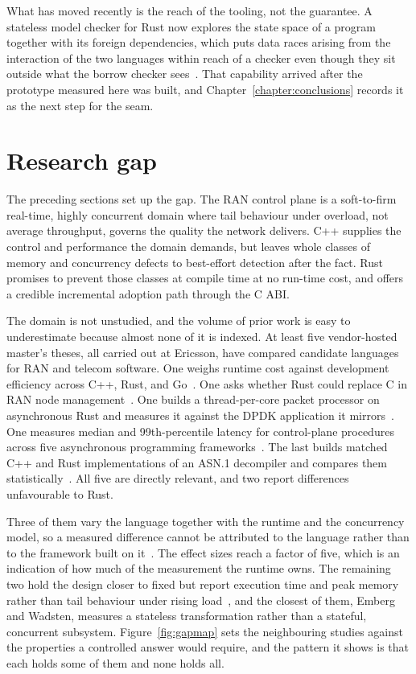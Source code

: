 \documentclass[english,twoside,openright,a4paper,censored,csm,software-track-2020]{HYthesisML}
\begin{document}
What has moved recently is the reach of the tooling, not the guarantee. A stateless model
checker for Rust now explores the state space of a program together with its foreign
dependencies, which puts data races arising from the interaction of the two languages within
reach of a checker even though they sit outside what the borrow checker
sees~\cite{pearce2026rustmc}. That capability arrived after the prototype measured here was
built, and Chapter~\ref{chapter:conclusions} records it as the next step for the seam.

\section{Research gap}\label{sec:gap}
The preceding sections set up the gap. The RAN control plane is a soft-to-firm real-time,
highly concurrent domain where tail behaviour under overload, not average throughput, governs
the quality the network delivers. C++ supplies the control and performance the domain demands,
but leaves whole classes of memory and concurrency defects to best-effort detection after the
fact. Rust promises to prevent those classes at compile time at no run-time cost, and offers a
credible incremental adoption path through the C ABI.

The domain is not unstudied, and the volume of prior work is easy to underestimate because
almost none of it is indexed. At least five vendor-hosted master's theses, all carried out at
Ericsson, have compared candidate languages for RAN and telecom software. One weighs runtime
cost against development efficiency across C++, Rust, and Go~\cite{karlback2021ran}. One asks
whether Rust could replace C in RAN node management~\cite{olsson2023ranmgmt}. One builds a
thread-per-core packet processor on asynchronous Rust and measures it against the DPDK
application it mirrors~\cite{olsson2023asyncpackets}. One measures median and 99th-percentile
latency for control-plane procedures across five asynchronous programming
frameworks~\cite{arvidsson2025async}. The last builds matched C++ and Rust implementations of an
ASN.1 decompiler and compares them statistically~\cite{emberg2023asn1}. All five are directly
relevant, and two report differences unfavourable to Rust.

Three of them vary the language together with the runtime and the concurrency model, so a
measured difference cannot be attributed to the language rather than to the framework built on
it~\cite{karlback2021ran,olsson2023asyncpackets,arvidsson2025async}. The effect sizes reach a
factor of five, which is an indication of how much of the measurement the runtime owns. The
remaining two hold the design closer to fixed but report execution time and peak memory rather
than tail behaviour under rising load~\cite{olsson2023ranmgmt,emberg2023asn1}, and the closest
of them, Emberg and Wadsten, measures a stateless transformation rather than a stateful,
concurrent subsystem. Figure~\ref{fig:gapmap} sets the neighbouring studies against the
properties a controlled answer would require, and the pattern it shows is that each holds some
of them and none holds all.
\end{document}
